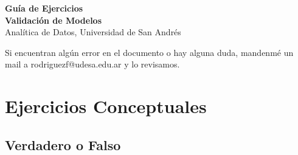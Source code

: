 \documentclass[12pt]{article}
\begin{document}
\begin{center}
  {\LARGE \textbf{Guía de Ejercicios\\Validación de Modelos}}\\[0.5em]
  {Analítica de Datos, Universidad de San Andrés}
\end{center}

Si encuentran algún error en el documento o hay alguna duda, mandenmé un mail a rodriguezf@udesa.edu.ar y lo revisamos.

\section{Ejercicios Conceptuales}

\subsection{Verdadero o Falso}
\end{document}
